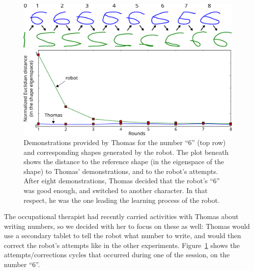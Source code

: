 \documentclass{article}
\begin{document}
\begin{figure}
    \centering
    \includegraphics[width=0.9\linewidth]{learning_6_demos}

    \vspace{1em}

    \includegraphics[width=0.7\linewidth]{learning_6_distances}
    \caption{\small Demonstrations provided by Thomas for the number ``6'' (top
        row) and corresponding shapes generated by the robot. The plot beneath
        shows the distance to the reference shape (in the eigenspace of the
        shape) to Thomas' demonstrations, and to the robot's attempts. After
        eight demonstrations, Thomas decided that the robot's ``6'' was good
        enough, and switched to another character. In that respect, he was the
        one leading the learning process of the robot.}

    \label{learning_6_demos}
\end{figure}


The occupational therapist had recently carried activities with Thomas about
writing numbers, so we decided with her to focus on these as well: Thomas would
use a secondary tablet to tell the robot what number to write, and would then
correct the robot's attempts like in the other experiments.
Figure~\ref{learning_6_demos} shows the attempts/corrections cycles that
occurred during one of the session, on the number ``6''.

\end{document}
